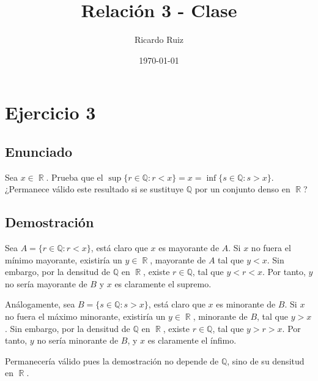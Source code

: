 \documentclass[11pt]{article}
\author{Ricardo Ruiz}
\date{\today}
\title{Relación 3 - Clase}
\DeclareMathOperator{\R}{\mathbb{R}}
\begin{document}
\maketitle

\section{Ejercicio 3}
\label{sec-1}

\subsection{Enunciado}
\label{sec-1-1}
Sea $x \in \R$. Prueba que el $\sup\{r \in \mathbb{Q}: r < x\} = x =
\inf\{s \in \mathbb{Q}: s > x\}$.  ¿Permanece válido este resultado si
se sustituye $\mathbb{Q}$ por un conjunto denso en $\R$?

\subsection{Demostración}
\label{sec-1-2}

Sea $A = \{r \in \mathbb{Q}: r < x \}$, está claro que $x$ es
mayorante de $A$.  Si $x$ no fuera el mínimo mayorante, existiría un
$y \in \R$, mayorante de $A$ tal que $y < x$.  Sin embargo, por la
densitud de $\mathbb{Q}$ en $\R$, existe $r \in \mathbb{Q}$, tal que
$y < r < x$.  Por tanto, $y$ no sería mayorante de $B$ y $x$ es
claramente el supremo.

Análogamente, sea $B = \{s \in \mathbb{Q}: s > x \}$, está claro que
$x$ es minorante de $B$. Si $x$ no fuera el máximo minorante,
existiría un $y \in \R$, minorante de $B$, tal que $y > x$.  Sin
embargo, por la densitud de $\mathbb{Q}$ en $\R$, existe $r \in
\mathbb{Q}$, tal que $y > r > x$.  Por tanto, $y$ no sería minorante
de $B$, y $x$ es claramente el ínfimo.

Permanecería válido pues la demostración no depende de $\mathbb{Q}$,
sino de su densitud en $\R$.
\end{document}
